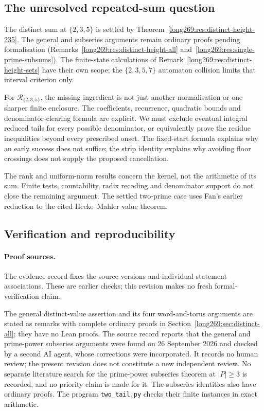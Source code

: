 \subsection{The unresolved repeated-sum question}\label{long269:sec:remaining-question}

The distinct sum at $\{2,3,5\}$ is settled by
Theorem~\ref{long269:res:distinct-height-235}. The general and subseries
arguments remain ordinary proofs pending formalisation
(Remarks~\ref{long269:res:distinct-height-all}
and~\ref{long269:res:single-prime-subsums}). The finite-state calculations
of Remark~\ref{long269:res:distinct-height-sets} have their own scope;
the $\{2,3,5,7\}$ automaton collision limits that interval criterion only.

For $\mathcal R_{\{2,3,5\}}$, the missing ingredient is not just another
normalisation or one sharper finite enclosure. The coefficients, recurrence,
quadratic bounds and denominator-clearing formula are explicit. We must
exclude eventual integral reduced tails for every possible denominator,
or equivalently prove the residue inequalities beyond every prescribed
onset. The fixed-start formula explains why an early success does not
suffice; the strip identity explains why avoiding floor crossings does
not supply the proposed cancellation.

The rank and uniform-norm results concern the kernel, not the arithmetic
of its sum.  Finite tests, countability, radix recoding and denominator
support do not close the remaining argument.  The settled two-prime case
uses Fan's earlier reduction to the cited Hecke--Mahler value theorem.

\subsection*{Verification and reproducibility}\label{long269:sec:proof-sources}
\evidenceparagraph{\evidencerecordurl}

\paragraph{Proof sources.}
The evidence record fixes the source versions and individual statement
associations. These are earlier checks; this revision makes no fresh
formal-verification claim.

The general distinct-value assertion and its four word-and-torus
arguments are stated as remarks with complete ordinary proofs in
Section~\ref{long269:sec:distinct-all}; they have no Lean proofs. The source record reports that the general and
prime-power subseries arguments were found on 26 September 2026 and checked
by a second AI agent, whose corrections were incorporated. It records
no human review; the present revision does not constitute a new independent
review. No separate literature search for the prime-power subseries theorem
at $|P|\ge3$ is recorded, and no priority claim is made for it. The
subseries identities also have ordinary proofs. The program
\texttt{two\_tail.py} checks their finite instances in exact arithmetic.

